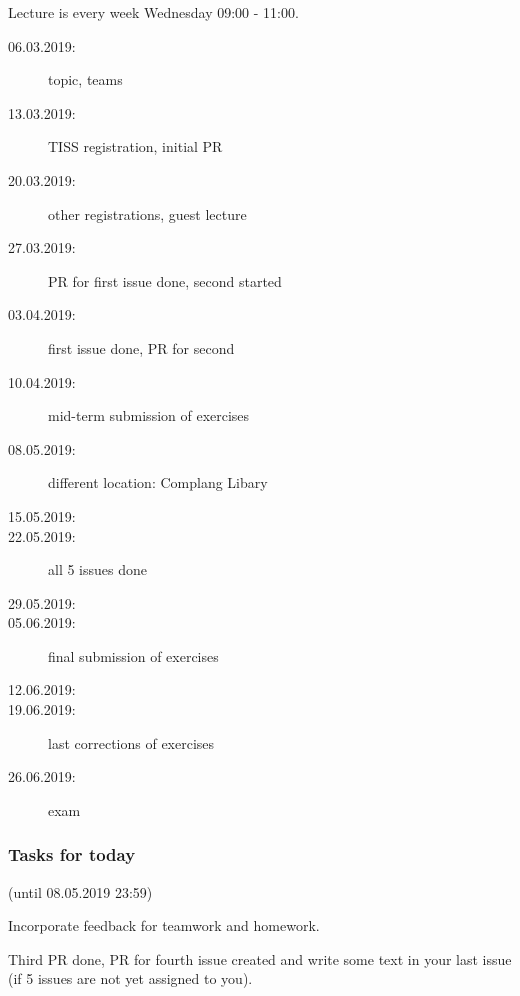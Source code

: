 

\date{08.05.2018}



\renewcommand{\enquote}[1]{\emph{``#1''}} %

\begin{frame}
	\titlepage
	\doclicenseThis
\end{frame}


\begin{frame}
	Lecture is every week Wednesday 09:00 - 11:00.

	\begin{description}
		\item[06.03.2019:] {\color{gray}topic, teams}
		\item[13.03.2019:] {\color{gray}TISS registration, initial PR}
		\item[20.03.2019:] {\color{gray}other registrations, guest lecture}
		\item[27.03.2019:] {\color{gray}PR for first issue done, second started}
		\item[03.04.2019:] {\color{gray}first issue done, PR for second}
		\item[10.04.2019:] {\color{gray}mid-term submission of exercises}
		\item[08.05.2019:] {\color{red}different location: Complang Libary}
		\item[15.05.2019:]
		\item[22.05.2019:] all 5 issues done
		\item[29.05.2019:]
		\item[05.06.2019:] final submission of exercises
		\item[12.06.2019:]
		\item[19.06.2019:] last corrections of exercises
		\item[26.06.2019:] exam
	\end{description}
\end{frame}

\begin{assignment}
	\frametitle{Tasks for today}
	(until 08.05.2019 23:59)
	
	\begin{task}
	Incorporate feedback for teamwork and homework.
	\end{task}

	\begin{task}
	Third PR done, PR for fourth issue created and write some text in your last issue (if 5 issues are not yet assigned to you).
	\end{task}
\end{assignment}

